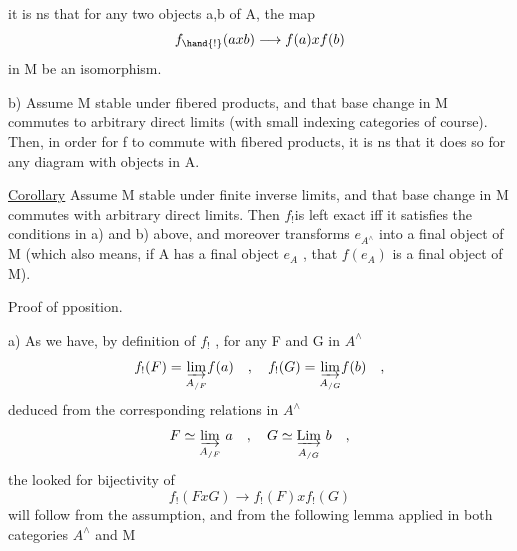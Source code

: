 
it is ns that for any two objects a,b of A, the map
\margin{(*)} \[ f_{\hand{!}}(axb)\longrightarrow f(a)xf(b) \]
in M be an isomorphism.

b) Assume M stable under fibered products, and that base change in
M commutes to arbitrary direct limits (with small indexing categories of
course). Then, in order for f to commute with fibered products, it is
ns that it does so for any diagram
 \margin{\unsure{)}}
with  objects in A.

\uline{Corollary} Assume M stable under finite inverse limits, and that base
change in M commutes with arbitrary direct limits. Then $f_{!}$is left exact
iff  it satisfies the conditions in a) and b) above, and moreover
transforms $e_{A^\wedge}$ into a final object of M (which also means, if A has a
final object $e_A$ , that $f(e_A)$ is a final object of M).

Proof of pposition. 

a) As we have, by definition of $f_{!}$ , for any F and G in $A^\wedge$
\[ f_{!}(F) = \underset{A_{/F}}{\varinjlim} f(a) \quad , \quad f_{!}(G) = \underset{A_{/G}}{\varinjlim} f(b) \quad , \]
deduced from the corresponding relations in $A^\wedge$
\[ F \simeq \underset{A_{/F}}{\varinjlim}\ a \quad , \quad G \simeq \underset{A_{/G}}{\underrightarrow{\mathrm{Lim}}}\ b \quad , \]
the looked for bijectivity of
\[ f_{!}(FxG) \to f_{!}(F)xf_{!}(G) \]
will follow from the assumption\inserted{(*)}, and from the following lemma\hand{,} \hand{(}applied
in both categories $A^\wedge$ and M \hand{)} 

